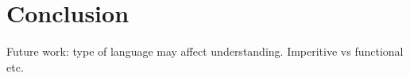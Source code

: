
\chapter{Conclusion}
\label{cha:conclusion}


Future work: type of language may affect understanding. Imperitive vs functional etc.



